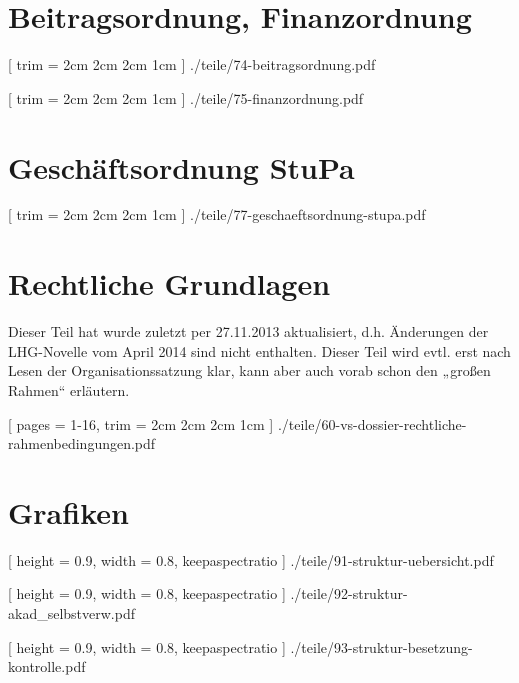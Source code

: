 \documentclass[
	10pt,
	a5paper,
	twoside
	]
	{book}
\begin{document}
\chapter{Beitragsordnung, Finanzordnung}


\clearpage


[
trim = 2cm 2cm 2cm 1cm
]
{./teile/74-beitragsordnung.pdf}


	[
		trim = 2cm 2cm 2cm 1cm
	]
	{./teile/75-finanzordnung.pdf}


\chapter{Geschäftsordnung StuPa}

\clearpage


[
trim = 2cm 2cm 2cm 1cm
]
{./teile/77-geschaeftsordnung-stupa.pdf}



\chapter{Rechtliche Grundlagen}

Dieser Teil hat wurde zuletzt per 27.11.2013 aktualisiert, d.h. Änderungen der LHG-Novelle vom April 2014 sind nicht enthalten. Dieser Teil wird evtl. erst nach Lesen der Organisationssatzung klar, kann aber auch vorab schon den „großen Rahmen“ erläutern.

\clearpage


[
pages = 1-16,
trim = 2cm 2cm 2cm 1cm
]
{./teile/60-vs-dossier-rechtliche-rahmenbedingungen.pdf}



\chapter{Grafiken}

\clearpage



	[
		height = 0.9\paperheight,
		width = 0.8\paperwidth,
		keepaspectratio
	]
	{./teile/91-struktur-uebersicht.pdf}




	[
		height = 0.9\paperheight,
		width = 0.8\paperwidth,
		keepaspectratio
	]
	{./teile/92-struktur-akad_selbstverw.pdf}




	[
		height = 0.9\paperheight,
		width = 0.8\paperwidth,
		keepaspectratio
	]
	{./teile/93-struktur-besetzung-kontrolle.pdf}



\backmatter


\end{document}
